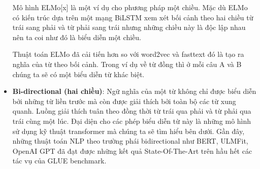 \begin{itemize}
    Mô hình ELMo[x] là một ví dụ cho phương pháp một chiều. Mặc dù ELMo có kiến trúc dựa trên một mạng BiLSTM xem xét bối cảnh theo hai chiều từ trái sang phải và từ phải sang trái nhưng những chiều này là độc lập nhau nên ta coi như đó là biểu diễn một chiều.

    Thuật toán ELMo đã cải tiến hơn so với word2vec và fasttext đó là tạo ra nghĩa của từ theo bối cảnh. Trong ví dụ về từ đồng thì ở mỗi câu A và B chúng ta sẽ có một biểu diễn từ khác biệt.

    \item \textbf{Bi-directional (hai chiều)}: Ngữ nghĩa của một từ không chỉ được biểu diễn bởi những từ liền trước mà còn được giải thích bởi toàn bộ các từ xung quanh. Luồng giải thích tuân theo đồng thời từ trái qua phải và từ phải qua trái cùng một lúc. Đại diện cho các phép biểu diễn từ này là những mô hình sử dụng kỹ thuật transformer mà chúng ta sẽ tìm hiểu bên dưới. Gần đây, những thuật toán NLP theo trường phái bidirectional như BERT, ULMFit, OpenAI GPT đã đạt được những kết quả State-Of-The-Art trên hầu hết các tác vụ của GLUE benchmark.
\end{itemize}